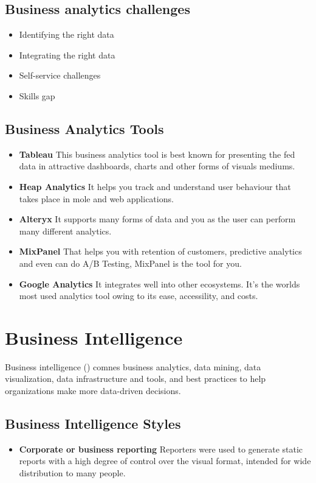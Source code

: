 \documentclass{article}
\begin{document}
\begin{multicols}{2}
\subsection{Business analytics challenges}
\begin{itemize}
\item Identifying the right data
\item Integrating the right data
\item Self-service challenges
\item Skills gap
\end{itemize}

\subsection{Business Analytics Tools}
\begin{itemize}
\item \textbf{Tableau}
 This business analytics tool is best known for presenting the fed data in attractive dashboards, charts and other forms of visuals mediums.
\item \textbf{Heap Analytics}
It helps you track and understand user behaviour that takes place in mole and web applications. 
\item \textbf{Alteryx}
 It supports many forms of data and you as the user can perform many different analytics. 
\item \textbf{MixPanel}
That helps you with retention of customers, predictive analytics and even can do A/B Testing, MixPanel is the tool for you. 
\item \textbf{Google Analytics}
It integrates well into other ecosystems. It's the worlds most used analytics tool owing to its ease, accessility, and costs.
\end{itemize}



\section{Business Intelligence}

Business intelligence () comnes business analytics, data mining, data visualization, data infrastructure and tools, and best practices to help organizations make more data-driven decisions.


\subsection{Business Intelligence Styles}
\begin{itemize}
\item \textbf{ Corporate or business reporting}
Reporters were used to generate static reports with a high degree of control over the visual format, intended for wide distribution to many people.


\end{itemize}
\end{multicols}
\end{document}

